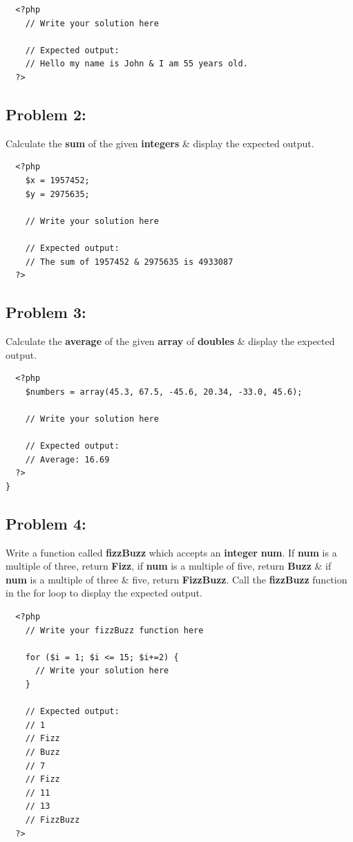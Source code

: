 \documentclass{article}
\begin{document}
\begin{verbatim}
  <?php
    // Write your solution here

    // Expected output:
    // Hello my name is John & I am 55 years old.
  ?>
\end{verbatim}

\subsection*{Problem 2:} Calculate the \textbf{sum} of the given \textbf{integers} \& display the expected output.

\begin{verbatim}
  <?php
    $x = 1957452;
    $y = 2975635;

    // Write your solution here

    // Expected output:
    // The sum of 1957452 & 2975635 is 4933087
  ?>
\end{verbatim}

\subsection*{Problem 3:} 
Calculate the \textbf{average} of the given \textbf{array} of \textbf{doubles} \& display the expected output.

\begin{verbatim}
  <?php
    $numbers = array(45.3, 67.5, -45.6, 20.34, -33.0, 45.6);

    // Write your solution here

    // Expected output:
    // Average: 16.69 
  ?>
}
\end{verbatim}

\subsection*{Problem 4:}
Write a function called \textbf{fizzBuzz} which accepts an \textbf{integer} \textbf{num}. If \textbf{num} is a multiple of three, return \textbf{Fizz}, if \textbf{num} is a multiple of five, return \textbf{Buzz} \& if \textbf{num} is a multiple of three \& five, return \textbf{FizzBuzz}. Call the \textbf{fizzBuzz} function in the for loop to display the expected output.

\begin{verbatim}
  <?php
    // Write your fizzBuzz function here
    
    for ($i = 1; $i <= 15; $i+=2) {
      // Write your solution here
    }

    // Expected output:
    // 1
    // Fizz
    // Buzz
    // 7
    // Fizz
    // 11
    // 13
    // FizzBuzz
  ?>
\end{verbatim}
\end{document}
